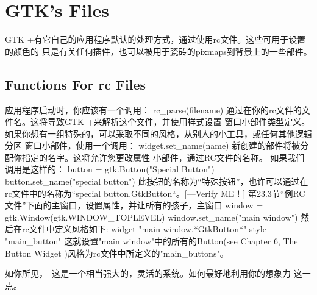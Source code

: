 \chapter{GTK's Files}
GTK +有它自己的应用程序默认的处理方式，通过使用rc文件。这些可用于设置的颜色的
只是有关任何插件，也可以被用于瓷砖的pixmaps到背景上的一些部件。
\section{Functions For rc Files}
应用程序启动时，你应该有一个调用：
rc_parse(filename)
通过在你的rc文件的文件名。这将导致GTK +来解析这个文件，并使用样式设置
窗口小部件类型定义。
如果你想有一组特殊的，可以采取不同的风格，从别人的小工具，或任何其他逻辑分区
窗口小部件，使用一个调用：	
widget.set_name(name)
新创建的部件将被分配你指定的名字。这将允许您更改属性
小部件，通过RC文件的名称。
如果我们调用是这样的：
button = gtk.Button("Special Button")
button.set_name("special button")
此按钮的名称为“特殊按钮”，也许可以通过在rc文件中的名称为“special
button.GtkButton“。[---Verify ME！]
第23.3节“例RC文件”下面的主窗口，设置属性，并让所有的孩子，主窗口
window = gtk.Window(gtk.WINDOW_TOPLEVEL)
window.set_name("main window")
然后在rc文件中定义风格如下:
widget "main window.*GtkButton*" style "main_button"
这就设置"main window"中的所有的Button(see Chapter 6, The Button Widget
)风格为rc文件中所定义的"main_buttons"。

如你所见， 这是一个相当强大的，灵活的系统。如何最好地利用你的想象力
这一点。
